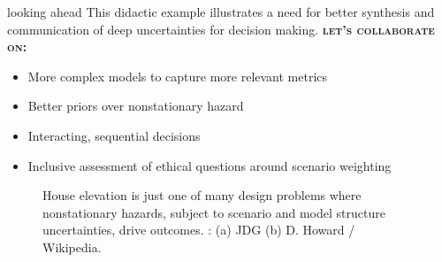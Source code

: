 \begin{block}{looking ahead}
    This didactic example illustrates a need for better synthesis and communication of deep uncertainties for decision making.
    \textbf{\scshape let's collaborate on:}
    \begin{itemize}
        \item More complex models to capture more relevant metrics
        \item Better priors over nonstationary hazard
        \item Interacting, sequential decisions
        \item Inclusive assessment of ethical questions around scenario weighting
    \end{itemize}
    \begin{framed}
        \begin{figure}
            \centering
            \hfill
            \caption{
                House elevation is just one of many design problems where nonstationary hazards, subject to scenario and model structure uncertainties, drive outcomes.
                : (a) JDG (b) D. Howard / Wikipedia.
            }
            \label{fig:images}
        \end{figure}
    \end{framed}
\end{block}